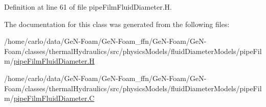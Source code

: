 Definition at line 61 of file pipe\+Film\+Fluid\+Diameter.\+H.



The documentation for this class was generated from the following files\+:\begin{DoxyCompactItemize}
\item 
/home/carlo/data/\+Ge\+N-\/\+Foam/\+Ge\+N-\/\+Foam\+\_\+ffn/\+Ge\+N-\/\+Foam/\+Ge\+N-\/\+Foam/classes/thermal\+Hydraulics/src/physics\+Models/fluid\+Diameter\+Models/pipe\+Film/\hyperlink{pipeFilmFluidDiameter_8H}{pipe\+Film\+Fluid\+Diameter.\+H}\item 
/home/carlo/data/\+Ge\+N-\/\+Foam/\+Ge\+N-\/\+Foam\+\_\+ffn/\+Ge\+N-\/\+Foam/\+Ge\+N-\/\+Foam/classes/thermal\+Hydraulics/src/physics\+Models/fluid\+Diameter\+Models/pipe\+Film/\hyperlink{pipeFilmFluidDiameter_8C}{pipe\+Film\+Fluid\+Diameter.\+C}\end{DoxyCompactItemize}
